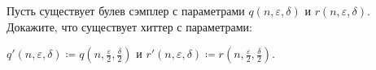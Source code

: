Пусть существует булев сэмплер с параметрами $q(n, \varepsilon, \delta)$ и $r(n, \varepsilon,
\delta)$. Докажите, что существует хиттер с параметрами:

$q'(n, \varepsilon, \delta) \coloneqq q\left(n, \frac{\varepsilon}{2}, \frac{\delta}{2}\right)$ и
$r'(n, \varepsilon, \delta) \coloneqq r\left(n, \frac{\varepsilon}{2}, \frac{\delta}{2}\right)$.